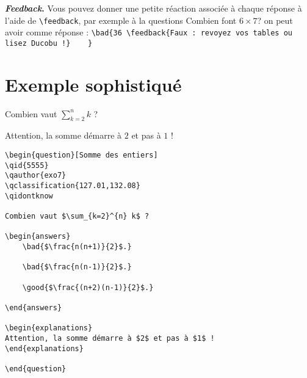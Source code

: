 \documentclass[12pt,a4paper]{article}
\begin{document}
\bigskip
\textbf{\emph{Feedback}.} Vous pouvez donner une petite réaction associée à chaque réponse à l'aide de \verb|\feedback|, par exemple à la questions \og{}Combien font $6\times 7$?\fg{} on peut avoir comme réponse : 
\verb|\bad{36 \feedback{Faux : revoyez vos tables ou lisez Ducobu !}	}|



\section{Exemple sophistiqué}

\begin{center}
\begin{minipage}{0.8\textwidth}
\begin{question}
\qidontknow

Combien vaut $\sum_{k=2}^{n} k$ ?

\begin{answers}
    
    
\end{answers}

\begin{explanations}
Attention, la somme démarre à $2$ et pas à $1$ !
\end{explanations}

\end{question}
\end{minipage}
\end{center}

\begin{center}
\begin{minipage}{0.8\textwidth}
\begin{verbatim}
\begin{question}[Somme des entiers]
\qid{5555}
\qauthor{exo7}
\qclassification{127.01,132.08}
\qidontknow

Combien vaut $\sum_{k=2}^{n} k$ ?

\begin{answers}
    \bad{$\frac{n(n+1)}{2}$.}
    
    \bad{$\frac{n(n-1)}{2}$.} 
    
    \good{$\frac{(n+2)(n-1)}{2}$.}        

\end{answers}

\begin{explanations}
Attention, la somme démarre à $2$ et pas à $1$ !
\end{explanations}

\end{question}
\end{verbatim}
\end{minipage}
\end{center}
\end{document}
